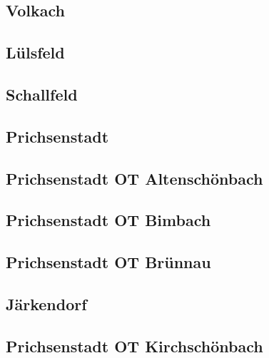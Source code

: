 \documentclass[fontsize=12pt,a4paper]{scrreprt}
\begin{document}
\begin{landscape}
                \subsection{Volkach}
                
                
                \subsection{Lülsfeld}
                
                
                \subsection{Schallfeld}
                
                
                \subsection{Prichsenstadt}
                
                
                \subsection{Prichsenstadt OT Altenschönbach}
                
                
                \subsection{Prichsenstadt OT Bimbach}
                
                
                \subsection{Prichsenstadt OT Brünnau}
                
                
                \subsection{Järkendorf}
                
                
                \subsection{Prichsenstadt OT Kirchschönbach}
                
                

\end{landscape}
\end{document}
